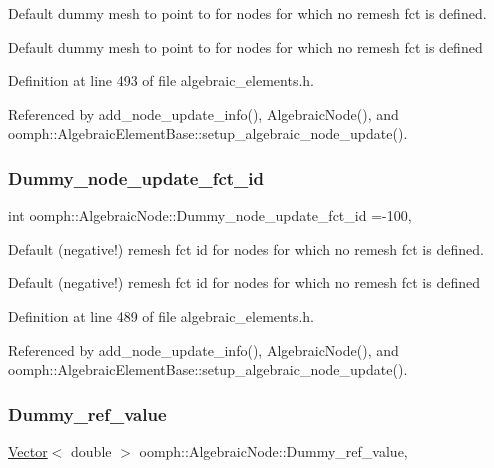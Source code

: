 Default dummy mesh to point to for nodes for which no remesh fct is defined. 

Default dummy mesh to point to for nodes for which no remesh fct is defined 

Definition at line 493 of file algebraic\+\_\+elements.\+h.



Referenced by add\+\_\+node\+\_\+update\+\_\+info(), Algebraic\+Node(), and oomph\+::\+Algebraic\+Element\+Base\+::setup\+\_\+algebraic\+\_\+node\+\_\+update().

\mbox{\label{classoomph_1_1AlgebraicNode_af6d3b50db54114b5cf22f86c0ceed2f8}} 
\subsubsection{\texorpdfstring{Dummy\+\_\+node\+\_\+update\+\_\+fct\+\_\+id}{Dummy\_node\_update\_fct\_id}}
{\footnotesize\ttfamily int oomph\+::\+Algebraic\+Node\+::\+Dummy\+\_\+node\+\_\+update\+\_\+fct\+\_\+id =-\/100\hspace{0.3cm}{\ttfamily [static]}, {\ttfamily [private]}}



Default (negative!) remesh fct id for nodes for which no remesh fct is defined. 

Default (negative!) remesh fct id for nodes for which no remesh fct is defined 

Definition at line 489 of file algebraic\+\_\+elements.\+h.



Referenced by add\+\_\+node\+\_\+update\+\_\+info(), Algebraic\+Node(), and oomph\+::\+Algebraic\+Element\+Base\+::setup\+\_\+algebraic\+\_\+node\+\_\+update().

\mbox{\label{classoomph_1_1AlgebraicNode_af73f0a803e1bdf2a7a1c7f1f4384df61}} 
\subsubsection{\texorpdfstring{Dummy\+\_\+ref\+\_\+value}{Dummy\_ref\_value}}
{\footnotesize\ttfamily \hyperlink{classoomph_1_1Vector}{Vector}$<$ double $>$ oomph\+::\+Algebraic\+Node\+::\+Dummy\+\_\+ref\+\_\+value\hspace{0.3cm}{\ttfamily [static]}, {\ttfamily [private]}}



